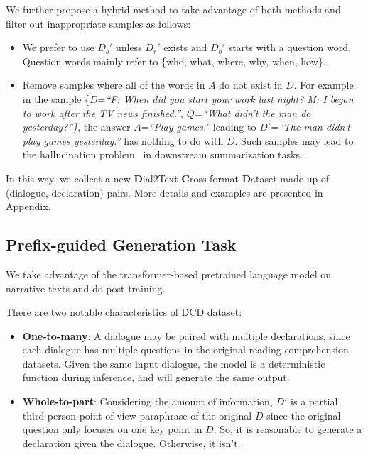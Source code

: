 We further propose a hybrid method to take advantage of both methods and filter out inappropriate samples as follows:
\begin{itemize}
	\item We prefer to use $D_b'$ unless $D_r'$ exists and $D_b'$ starts with a question word. Question words mainly refer to \{who, what, where, why, when, how\}.
	\item Remove samples where all of the words in $A$ do not exist in $D$. For example, in the sample \{$D$=\textit{``F: When did you start your work last night? M: I began to work after the TV news finished.''}, $Q$=\textit{``What didn't the man do yesterday?''\}}, the answer $A$=\textit{``Play games.''} leading to $D'$=\textit{``The man didn't play games yesterday.''} has nothing to do with $D$. Such samples may lead to the hallucination problem~\cite{durmus2020feqa,wang2020asking} in downstream summarization tasks.
\end{itemize}
In this way, we collect a new \textbf{D}ial2Text \textbf{C}ross-format \textbf{D}ataset made up of (dialogue, declaration) pairs. More details and examples are presented in Appendix.



\subsection{Prefix-guided Generation Task}\label{sec:pgt}

We take advantage of the transformer-based pretrained language model on narrative texts and do post-training.%

There are two notable characteristics of DCD dataset:
\begin{itemize}
	\item \textbf{One-to-many}: A dialogue may be paired with multiple declarations, since each dialogue has multiple questions in the original reading comprehension datasets. Given the same input dialogue, the model is a deterministic function during inference, and will generate the same output.
	\item \textbf{Whole-to-part}: Considering the amount of information, $D'$ is a partial third-person point of view paraphrase of the original $D$ since the original question only focuses on one key point in $D$. So, it is reasonable to generate a declaration given the dialogue. Otherwise, it isn't.%
\end{itemize}

